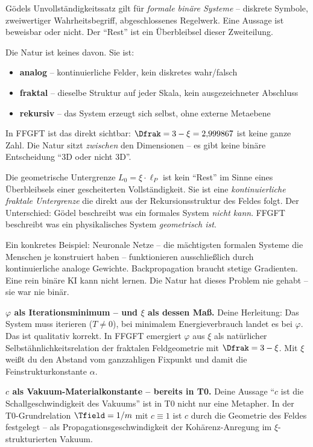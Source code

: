 \begin{response}
\medskip
\begin{warning}
Gödels Unvollständigkeitssatz gilt für \emph{formale binäre Systeme} -- diskrete Symbole, zweiwertiger Wahrheitsbegriff, abgeschlossenes Regelwerk. Eine Aussage ist beweisbar oder nicht. Der ``Rest'' ist ein Überbleibsel dieser Zweiteilung.

Die Natur ist keines davon. Sie ist:
\begin{itemize}[noitemsep]
  \item \textbf{analog} -- kontinuierliche Felder, kein diskretes wahr/falsch
  \item \textbf{fraktal} -- dieselbe Struktur auf jeder Skala, kein ausgezeichneter Abschluss
  \item \textbf{rekursiv} -- das System erzeugt sich selbst, ohne externe Metaebene
\end{itemize}

In FFGFT ist das direkt sichtbar: $\Dfrak = 3 - \xi = 2{,}999867$ ist keine ganze Zahl. Die Natur sitzt \emph{zwischen} den Dimensionen -- es gibt keine binäre Entscheidung ``3D oder nicht 3D''.

Die geometrische Untergrenze $L_0 = \xi \cdot \ell_P$ ist kein ``Rest'' im Sinne eines Überbleibsels einer gescheiterten Vollständigkeit. Sie ist eine \emph{kontinuierliche fraktale Untergrenze} die direkt aus der Rekursionsstruktur des Feldes folgt. Der Unterschied: Gödel beschreibt was ein formales System \emph{nicht kann}. FFGFT beschreibt was ein physikalisches System \emph{geometrisch ist}.

\medskip
Ein konkretes Beispiel: Neuronale Netze -- die mächtigsten formalen Systeme die Menschen je konstruiert haben -- funktionieren ausschließlich durch kontinuierliche analoge Gewichte. Backpropagation braucht stetige Gradienten. Eine rein binäre KI kann nicht lernen. Die Natur hat dieses Problem nie gehabt -- sie war nie binär.
\end{warning}

\medskip
\textbf{$\varphi$ als Iterationsminimum -- und $\xi$ als dessen Maß.}
Deine Herleitung: Das System muss iterieren ($T \neq 0$), bei minimalem Energieverbrauch landet es bei $\varphi$. Das ist qualitativ korrekt. In FFGFT emergiert $\varphi$ aus $\xi$ als natürlicher Selbstähnlichkeitsrelation der fraktalen Feldgeometrie mit $\Dfrak = 3 - \xi$. Mit $\xi$ weißt du den Abstand vom ganzzahligen Fixpunkt und damit die Feinstrukturkonstante $\alpha$.

\medskip
\textbf{$c$ als Vakuum-Materialkonstante -- bereits in T0.}
Deine Aussage ``$c$ ist die Schallgeschwindigkeit des Vakuums'' ist in T0 nicht nur eine Metapher. In der T0-Grundrelation $\Tfield = 1/m$ mit $c \equiv 1$ ist $c$ durch die Geometrie des Feldes festgelegt -- als Propagationsgeschwindigkeit der Kohärenz-Anregung im $\xi$-strukturierten Vakuum.


\end{response}
